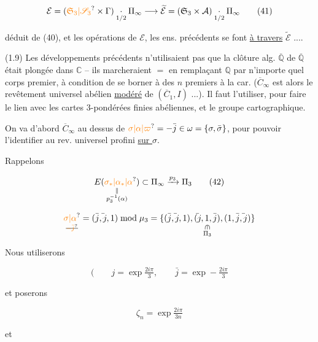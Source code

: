 \[
\mathcal E=(\unsure{\mathfrak S_3|\mathscr S_3}\times\Gamma)\underset{1/2}{\cdot}\Pi_\infty\longrightarrow
\widetilde{\mathcal E}=(\mathfrak S_3\times\mathcal A)\underset{1/2}{\cdot}\Pi_\infty
\tag*{(41)}
\]

déduit de (40), et les opérations de $\mathcal E$,  les ens. précédents se font \uline{à travers} $\widetilde{\mathcal E}$ ....

(1.9) Les développements précédents n'utilisaient pas que la clôture alg.  $\overline{\mathbb Q}$ de $\overline{\mathbb Q}$ était plongée dans $\mathbb C$ -- ils marcheraient $=$ en remplaçant $\mathbb Q$ par n'importe quel corps premier, à condition de se borner à des $n$ premiers à la car. ($\overline C_\infty$ est alors le revêtement universel abélien \uline{modéré} de $(\overline C_1,I)$ ...). Il faut l'utiliser, pour faire le lien avec les cartes $3$-pondérées finies abéliennes, et le groupe cartographique.

On va d'abord  $\overline C_\infty$ au dessus de $\unsure{\sigma|\alpha|\varpi}=-\bar j\in\omega=\{\sigma,\bar\sigma\}$, pour pouvoir l'identifier au rev. universel profini  \uline{sur $\sigma$}.


Rappelons

\[
\underset{\substack{\Vert\\p_3^{-1}(\alpha)}}{E(\unsure{\sigma_*|\alpha_*|\alpha})}\subset\Pi_\infty\xrightarrow{p_3}\Pi_3
\tag*{(42)}
\]

\[
\underset{\deleted{\unsure{-\bar j}}}{\unsure{\sigma|\alpha}}
=(\bar j,\deleted{\bar{\vphantom j}}j,1)\bmod\mu_3
=\underset{\substack{\rotatebox{-90}{$\in$}\\\Pi_3}}{\{(\bar j,\deleted{\bar{\vphantom j}}j,1),(\deleted{\bar{\vphantom j}}j,1,\bar j),(1,\bar j,\deleted{\bar{\vphantom j}}j)\}}
\]

 Nous  utiliserons

\[
(\qquad j=\exp\tfrac{2i\pi}{3},\qquad \bar j=\exp-\tfrac{2i\pi}{3}
\]

et poserons

\[
\zeta_n=\exp\tfrac{2i\pi}{3n}
\tag*{(43)}
\]

et

